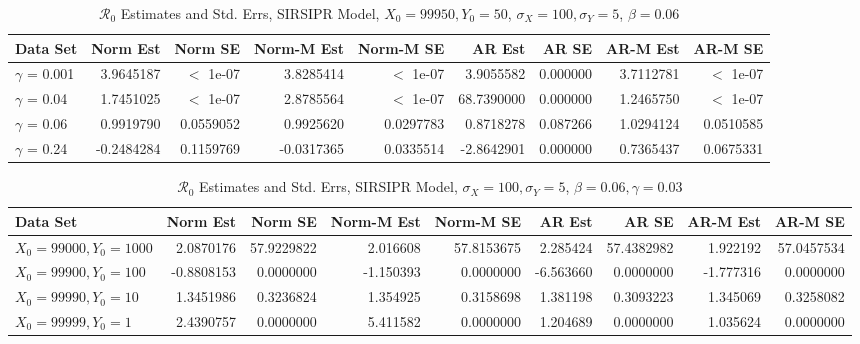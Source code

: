 \documentclass[12pt]{article}
\newcommand{\rr}{\ensuremath{\mathcal{R}_0}}
\begin{document}
\begin{table}[H]
	
	\caption{\label{tab:}$\rr$ Estimates and Std. Errs, SIRSIPR Model,
		$X_0 = 99950, Y_0 = 50$, $\sigma_X = 100, \sigma_Y = 5$, $\beta = 0.06$}
	\centering
	\begin{footnotesize}
		\begin{tabular}[t]{l|r|r|r|r|r|r|r|r}
			\hline
			Data Set & Norm Est & Norm SE & Norm-M Est & Norm-M SE & AR Est & AR SE & AR-M Est & AR-M SE\\
			\hline
			$\gamma$ = 0.001 & 3.9645187 & $<$ 1e-07 & 3.8285414 & $<$ 1e-07 & 3.9055582 & 0.000000 & 3.7112781 & $<$ 1e-07 \\
			\hline
			$\gamma$ = 0.04 & 1.7451025 & $<$ 1e-07 & 2.8785564 & $<$ 1e-07 & 68.7390000 & 0.000000 & 1.2465750 & $<$ 1e-07 \\
			\hline
			$\gamma$ = 0.06 & 0.9919790 & 0.0559052 & 0.9925620 & 0.0297783 & 0.8718278 & 0.087266 & 1.0294124 & 0.0510585\\
			\hline
			$\gamma$ = 0.24 & -0.2484284 & 0.1159769 & -0.0317365 & 0.0335514 & -2.8642901 & 0.000000 & 0.7365437 & 0.0675331\\
			\hline
		\end{tabular}
	\end{footnotesize}
\end{table}

\begin{table}[H]
	
	\caption{\label{tab:}$\rr$ Estimates and Std. Errs, SIRSIPR Model,
		$\sigma_X = 100, \sigma_Y = 5$, $\beta = 0.06, \gamma = 0.03$}
	\centering
	\begin{footnotesize}
		\begin{tabular}[t]{l|r|r|r|r|r|r|r|r}
			\hline
			Data Set & Norm Est & Norm SE & Norm-M Est & Norm-M SE & AR Est & AR SE & AR-M Est & AR-M SE\\
			\hline
			$X_0 = 99000, Y_0 = 1000$ & 2.0870176 & 57.9229822 & 2.016608 & 57.8153675 & 2.285424 & 57.4382982 & 1.922192 & 57.0457534\\
			\hline
			$X_0 = 99900, Y_0 = 100$ & -0.8808153 & 0.0000000 & -1.150393 & 0.0000000 & -6.563660 & 0.0000000 & -1.777316 & 0.0000000\\
			\hline
			$X_0 = 99990, Y_0 = 10$ & 1.3451986 & 0.3236824 & 1.354925 & 0.3158698 & 1.381198 & 0.3093223 & 1.345069 & 0.3258082\\
			\hline
			$X_0 = 99999, Y_0 = 1$ & 2.4390757 & 0.0000000 & 5.411582 & 0.0000000 & 1.204689 & 0.0000000 & 1.035624 & 0.0000000\\
			\hline
		\end{tabular}
	\end{footnotesize}
\end{table}
\end{document}

